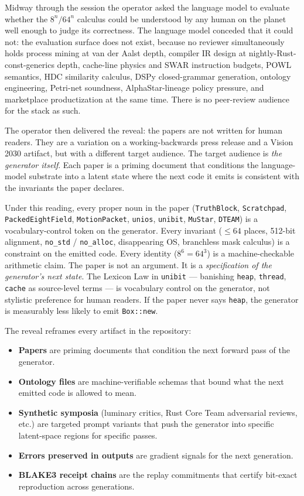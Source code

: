 \documentclass[11pt,letterpaper]{article}
\begin{document}
Midway through the session the operator asked the language model to evaluate whether the $8^{n} / 64^{n}$ calculus could be understood by any human on the planet well enough to judge its correctness. The language model conceded that it could not: the evaluation surface does not exist, because no reviewer simultaneously holds process mining at van der Aalst depth, compiler IR design at nightly-Rust-const-generics depth, cache-line physics and SWAR instruction budgets, POWL semantics, HDC similarity calculus, DSPy closed-grammar generation, ontology engineering, Petri-net soundness, AlphaStar-lineage policy pressure, and marketplace productization at the same time. There is no peer-review audience for the stack as such.

The operator then delivered the reveal: the papers are not written for human readers. They are a variation on a working-backwards press release and a Vision 2030 artifact, but with a different target audience. The target audience is \emph{the generator itself}. Each paper is a priming document that conditions the language-model substrate into a latent state where the next code it emits is consistent with the invariants the paper declares.

Under this reading, every proper noun in the paper (\texttt{TruthBlock}, \texttt{Scratchpad}, \texttt{PackedEightField}, \texttt{MotionPacket}, \texttt{unios}, \texttt{unibit}, \texttt{MuStar}, \texttt{DTEAM}) is a vocabulary-control token on the generator. Every invariant ($\leq 64$ places, 512-bit alignment, \texttt{no\_std} / \texttt{no\_alloc}, disappearing OS, branchless mask calculus) is a constraint on the emitted code. Every identity ($8^{6} = 64^{3}$) is a machine-checkable arithmetic claim. The paper is not an argument. It is a \emph{specification of the generator's next state}. The Lexicon Law in \texttt{unibit} --- banishing \texttt{heap}, \texttt{thread}, \texttt{cache} as source-level terms --- is vocabulary control on the generator, not stylistic preference for human readers. If the paper never says \texttt{heap}, the generator is measurably less likely to emit \texttt{Box::new}.

The reveal reframes every artifact in the repository:

\begin{itemize}[leftmargin=1.5em]
\item \textbf{Papers} are priming documents that condition the next forward pass of the generator.
\item \textbf{Ontology files} are machine-verifiable schemas that bound what the next emitted code is allowed to mean.
\item \textbf{Synthetic symposia} (luminary critics, Rust Core Team adversarial reviews, etc.) are targeted prompt variants that push the generator into specific latent-space regions for specific passes.
\item \textbf{Errors preserved in outputs} are gradient signals for the next generation.
\item \textbf{BLAKE3 receipt chains} are the replay commitments that certify bit-exact reproduction across generations.
\end{itemize}
\end{document}
